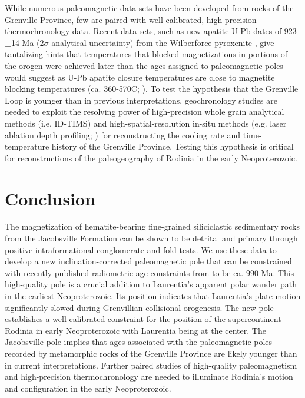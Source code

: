 While numerous paleomagnetic data sets have been developed from rocks of the Grenville Province, few are paired with well-calibrated, high-precision thermochronology data. Recent data sets, such as new apatite U-Pb dates of 923$\pm$14 Ma (2$\sigma$ analytical uncertainty) from the Wilberforce pyroxenite \cite{Paul2021a}, give tantalizing hints that temperatures that blocked magnetizations in portions of the orogen were achieved later than the ages assigned to paleomagnetic poles would suggest as U-Pb apatite closure temperatures are close to magnetite blocking temperatures (ca. 360-570\textdegree C; ). To test the hypothesis that the Grenville Loop is younger than in previous interpretations, geochronology studies are needed to exploit the resolving power of high-precision whole grain analytical methods (i.e. ID-TIMS) and high-spatial-resolution in-situ methods (e.g. laser ablation depth profiling; ) for reconstructing the cooling rate and time-temperature history of the Grenville Province. Testing this hypothesis is critical for reconstructions of the paleogeography of Rodinia in the early Neoproterozoic. 

\section*{Conclusion}

The magnetization of hematite-bearing fine-grained siliciclastic sedimentary rocks from the Jacobsville Formation can be shown to be detrital and primary through positive intraformational conglomerate and fold tests. We use these data to develop a new inclination-corrected paleomagnetic pole that can be constrained with recently published radiometric age constraints from  to be ca. 990 Ma. This high-quality pole is a crucial addition to Laurentia's apparent polar wander path in the earliest Neoproterozoic. Its position indicates that Laurentia's plate motion significantly slowed during Grenvillian collisional orogenesis. The new pole establishes a well-calibrated constraint for the position of the supercontinent Rodinia in early Neoproterozoic with Laurentia being at the center. The Jacobsville pole implies that ages associated with the paleomagnetic poles recorded by metamorphic rocks of the Grenville Province are likely younger than in current interpretations. Further paired studies of high-quality paleomagnetism and high-precision thermochronology are needed to illuminate Rodinia's motion and configuration in the early Neoproterozoic. 

